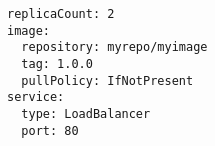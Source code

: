 \begin{verbatim}
replicaCount: 2
image:
  repository: myrepo/myimage
  tag: 1.0.0
  pullPolicy: IfNotPresent
service:
  type: LoadBalancer
  port: 80
\end{verbatim}